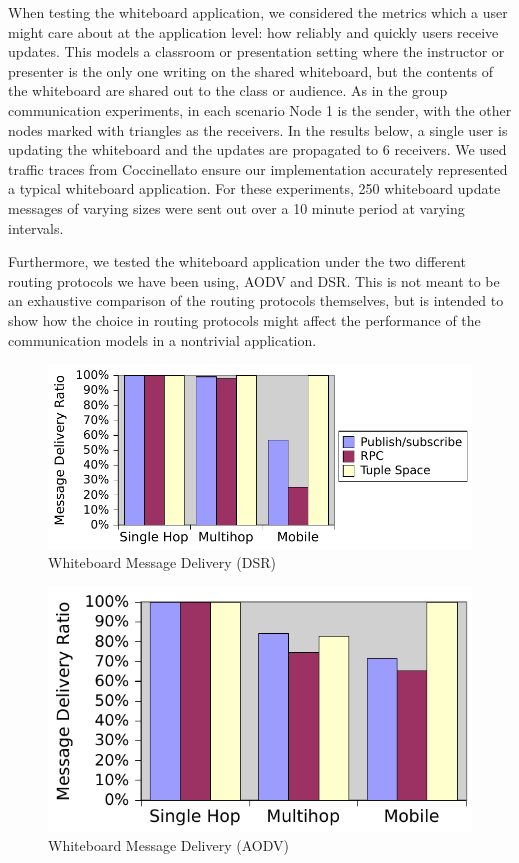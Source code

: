 When testing the whiteboard application, we considered the metrics which a user might care about at the application level: how reliably and quickly users receive updates.
This models a classroom or presentation setting where the instructor or presenter is the only one writing on the shared whiteboard, but the contents of the whiteboard are shared out to the class or audience. As in the group communication experiments, in each scenario Node 1 is the sender, with the other nodes marked with triangles as the receivers.
In the results below, a single user is updating the whiteboard and the updates are propagated to 6 receivers. We used traffic traces from  Coccinella\footnotemark to ensure our implementation accurately represented a typical whiteboard application. For these experiments, 250 whiteboard update messages of varying sizes were sent out over a 10 minute period at varying intervals.


Furthermore, we tested the whiteboard application under the two different routing protocols we have been using, AODV and DSR. This is not meant to be an exhaustive comparison of the routing protocols themselves, but is intended to show how the choice in routing protocols might affect the performance of the communication models in a nontrivial application.

\begin{figure}
\includegraphics[width = .9\textwidth, clip, trim = 6px 0px 4px 0px]{figures/wb-dsr-delivery.pdf}
\caption{Whiteboard Message Delivery (DSR)}
\label{fig:wbdeliverydsr}
\end{figure}	

\begin{figure}
\includegraphics[width = .9\textwidth, clip, trim = 6px 0px 2px 0px]{figures/wb-aodv-delivery.pdf}
\caption{Whiteboard Message Delivery (AODV)}
\label{fig:wbdeliveryaodv}
\end{figure}

